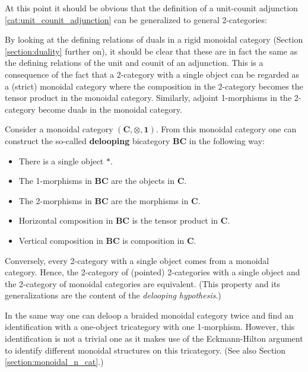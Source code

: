     At this point it should be obvious that the definition of a unit-counit adjunction \ref{cat:unit_counit_adjunction} can be generalized to general 2-categories:
    \begin{remark}
        By looking at the defining relations of duals in a rigid monoidal category (Section \ref{section:duality} further on), it should be clear that these are in fact the same as the defining relations of the unit and counit of an adjunction. This is a consequence of the fact that a 2-category with a single object can be regarded as a (strict) monoidal category where the composition in the 2-category becomes the tensor product in the monoidal category. Similarly, adjoint 1-morphisms in the 2-category become duals in the monoidal category.
    \end{remark}

    \begin{property}\label{cat:monoidal_or_2}
        Consider a monoidal category $(\mathbf{C},\otimes,\mathbf{1})$. From this monoidal category one can construct the so-called \textbf{delooping} bicategory $\mathbf{BC}$ in the following way:
        \begin{itemize}
            \item There is a single object $\ast$.
            \item The 1-morphisms in $\mathbf{BC}$ are the objects in $\mathbf{C}$.
            \item The 2-morphisms in $\mathbf{BC}$ are the morphisms in $\mathbf{C}$.
            \item Horizontal composition in $\mathbf{BC}$ is the tensor product in $\mathbf{C}$.
            \item Vertical composition in $\mathbf{BC}$ is composition in $\mathbf{C}$.
        \end{itemize}
        Conversely, every 2-category with a single object comes from a monoidal category. Hence, the 2-category of (pointed) 2-categories with a single object and the 2-category of monoidal categories are equivalent. (This property and its generalizations are the content of the \textit{delooping hypothesis}.)

        In the same way one can deloop a braided monoidal category twice and find an identification with a one-object tricategory with one 1-morphism. However, this identification is not a trivial one as it makes use of the Eckmann-Hilton argument to identify different monoidal structures on this tricategory. (See also Section \ref{section:monoidal_n_cat}.)
    \end{property}

